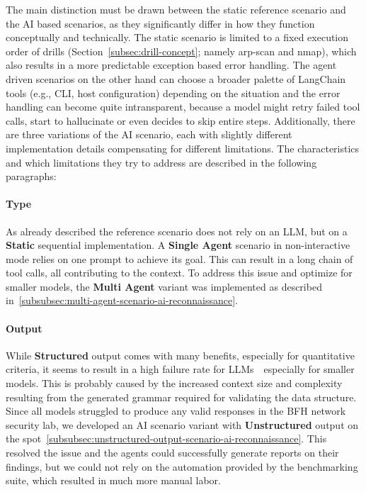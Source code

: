 The main distinction must be drawn between the static reference scenario and the \gls{AI} based scenarios,
as they significantly differ in how they function conceptually and technically.
The static scenario is limited to a fixed execution order of drills (Section~\ref{subsec:drill-concept}; namely arp-scan and nmap),
which also results in a more predictable exception based error handling.
The agent driven scenarios on the other hand can choose a broader palette of \gls{LangChain} tools (e.g., \gls{CLI}, host configuration) depending on the situation
and the error handling can become quite intransparent, because a model might retry failed tool calls, start to hallucinate or even decides to skip entire steps.
Additionally, there are three variations of the \gls{AI} scenario,
each with slightly different implementation details compensating for different limitations.
The characteristics and which limitations they try to address are described in the following paragraphs:

\paragraph{Type}
As already described the reference scenario does not rely on an \gls{LLM},
but on a \textbf{Static} sequential implementation.
A \textbf{Single Agent} scenario in non-interactive mode relies on one prompt to achieve its goal.
This can result in a long chain of tool calls, all contributing to the context.
To address this issue and optimize for smaller models,
the \textbf{Multi Agent} variant was implemented as described in~\ref{subsubsec:multi-agent-scenario-ai-reconnaissance}.

\paragraph{Output}
While \textbf{Structured} output comes with many benefits,
especially for quantitative criteria,
it seems to result in a high failure rate for \glspl{LLM}~\textthreequartersemdash~especially for smaller models.
This is probably caused by the increased context size and complexity resulting from the generated grammar required for validating the data structure.
Since all models struggled to produce any valid responses in the BFH network security lab,
we developed an \gls{AI} scenario variant with \textbf{Unstructured} output on the spot~\ref{subsubsec:unstructured-output-scenario-ai-reconnaissance}.
This resolved the issue and the agents could successfully generate reports on their findings,
but we could not rely on the automation provided by the benchmarking suite,
which resulted in much more manual labor.
